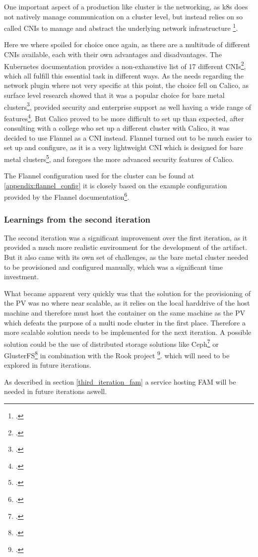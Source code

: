 One important aspect of a production like cluster is the networking, as \ac{k8s} does not natively manage communication on a cluster level,
but instead relies on so called \ac{CNI}s to manage and abstract the underlying network infrastructure \footcite{ClusterNetworking}.

Here we where spoiled for choice once again, as there are a multitude of different \ac{CNI}s available, each with their own advantages and disadvantages.
The Kubernetes documentation provides a non-exhaustive list of 17 different \ac{CNI}s\footcite{KubernetesCNIPlugins}, which all fulfill this essential task in different ways.
As the needs regarding the network plugin where not very specific at this point, the choice fell on Calico, as surface level research showed that it was a popular choice for bare metal clusters\footcite{ExploreNetworkPlugins},
provided security and enterprise support as well having a wide range of features\footcite{mehndirattaComparingKubernetesContainer}.
But Calico proved to be more difficult to set up than expected, after consulting with a college who set up a different cluster with Calico,
it was decided to use Flannel as a \ac{CNI} instead.
Flannel turned out to be much easier to set up and configure, as it is a very lightweight \ac{CNI} which is designed for bare metal clusters\footcite{Flannel2023}, 
and foregoes the more advanced security features of Calico. 

The Flannel configuration used for the cluster can be found at \ref{appendix:flannel_config} it is closely based on the example configuration provided by the Flannel documentation\footcite{FlannelInstallConfig}.

\subsubsection*{Learnings from the second iteration}

The second iteration was a significant improvement over the first iteration, as it provided a much more realistic environment for the development of the artifact.
But it also came with its own set of challenges, as the bare metal cluster needed to be provisioned and configured manually, which was a significant time investment.

What became apparent very quickly was that the solution for the provisioning of the \ac{PV} was no where near scalable,
as it relies on the local harddrive of the host machine and therefore must host the container on the same machine as the \ac{PV} which defeats the purpose of a multi node cluster in the first place.
Therefore a more scalable solution needs to be implemented for the next iteration.
A possible solution could be the use of distributed storage solutions like Ceph\footcite{CephIoHome} or GlusterFS\footcite{Gluster}  in combination with the Rook project \footcite{Rook}. 
which will need to be explored in future iterations.


As described in section \ref{third_iteration_fam} a service hosting \ac{FAM} will be needed in future iterations aswell.
